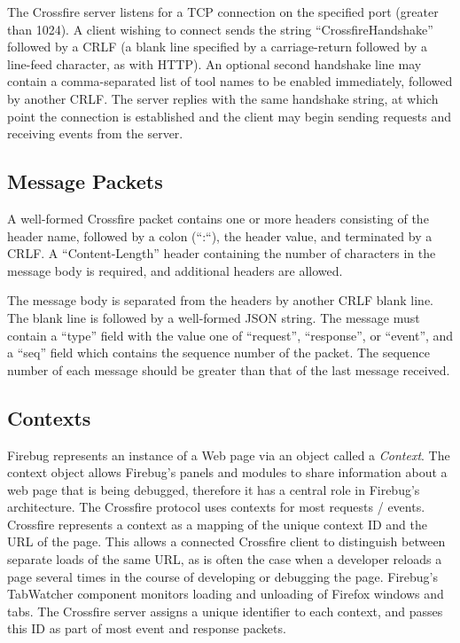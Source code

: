 The Crossfire server listens for a TCP connection on the specified port (greater
than 1024).  A client wishing to connect sends the string ``CrossfireHandshake''
followed by a CRLF (a blank line specified by a carriage-return followed by a
line-feed character, as with HTTP). An optional second handshake line may
contain a comma-separated list of tool names to be enabled immediately, followed
by another CRLF. The server replies with the same handshake string, at which
point the connection is established and the client may begin sending requests and
receiving events from the server.

\subsection {Message Packets}
A well-formed Crossfire packet contains one or more headers consisting of the
header name, followed by a colon (``:``), the header value, and terminated by a
CRLF. A ``Content-Length'' header containing the number of characters in the
message body is required, and additional headers are allowed.

The message body is separated from the headers by another CRLF blank line.
The blank line is followed by a well-formed JSON string. The message must contain a ``type'' field with the value one of
``request'', ``response'', or ``event'', and a ``seq'' field which contains the
sequence number of the packet. The sequence number of each message should
be greater than that of the last message received.

\subsection {Contexts}
Firebug represents an instance of a Web page via an object called a
\textit{Context}. The context object allows Firebug's panels and modules to
share information about a web page that is being debugged, therefore it has a
central role in Firebug's architecture. The Crossfire protocol uses contexts for
most requests / events. Crossfire represents a context as a mapping of the
unique context ID and the URL of the page. This allows a connected Crossfire
client to distinguish between separate loads of the same URL, as is often the
case when a developer reloads a page several times in the course of developing
or debugging the page.
Firebug's TabWatcher component monitors loading and unloading of Firefox windows
and tabs.  The Crossfire server assigns a unique identifier to each
context, and passes this ID as part of most event and response packets.


